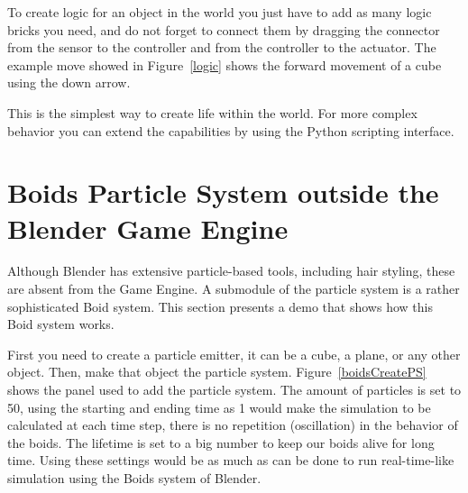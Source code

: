 To create logic for an object in the world you just have to add as many logic bricks you need, and do not forget to connect them by dragging the connector from the sensor to the controller and from the controller to the actuator. The example move showed in Figure~\ref{logic} shows the forward movement of a cube using the down arrow.

This is the simplest way to create life within the world. For more complex behavior you can extend the capabilities by using the Python scripting interface.

\section{Boids Particle System outside the Blender Game Engine}
Although Blender has extensive particle-based tools, including hair styling, these are absent from the Game Engine. A submodule of the particle system is a rather sophisticated Boid system. This section presents a demo that shows how this Boid system works.

First you need to create a particle emitter, it can be a cube, a plane, or any other object. Then, make that object the particle system. Figure~\ref{boidsCreatePS} shows the panel used to add the particle system. The amount of particles is set to 50, using the starting and ending time as 1 would make the simulation to be calculated at each time step, there is no repetition (oscillation) in the behavior of the boids. The lifetime is set to a big number to keep our boids alive for long time. Using these settings would be as much as can be done to run real-time-like simulation using the Boids system of Blender.

